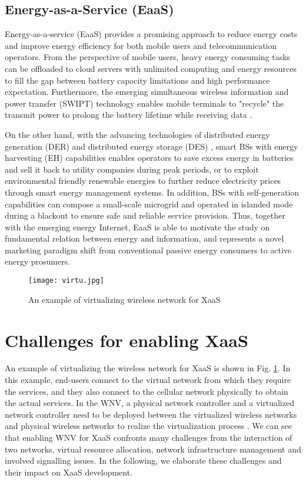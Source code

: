 \documentclass[12pt,draftclsnofoot,onecolumn]{IEEEtran}
\begin{document}
\subsection{Energy-as-a-Service (EaaS)}

Energy-as-a-service (EaaS) provides a promising approach to reduce
energy costs and improve energy efficiency for both mobile users
and telecommunication operators. From the perspective of mobile
users, heavy energy consuming tasks can be offloaded to cloud
servers with unlimited computing and energy resources to fill the
gap between battery capacity limitations and high performance
expectation. Furthermore, the emerging simultaneous wireless
information and power transfer (SWIPT) technology enables mobile
terminals to "recycle" the transmit power to prolong the battery
lifetime while receiving data \cite{Chang2}. \par

On the other hand, with the advancing technologies of distributed
energy generation (DER) and distributed energy storage (DES) \cite{Zhou},
smart BSs with energy harvesting (EH) capabilities enables
operators to save excess energy in batteries and sell it back to
utility companies during peak periods, or to exploit environmental
friendly renewable energies to further reduce electricity prices
through smart energy management systems. In addition, BSs with
self-generation capabilities can compose a small-scale microgrid
and operated in islanded mode during a blackout to ensure safe and
reliable service provision. Thus, together with the emerging
energy Internet, EaaS is able to motivate the study on fundamental
relation between energy and information, and represents a novel
marketing paradigm shift from conventional passive energy
consumers to active energy prosumers.

\begin{figure}[t]
\centering
\texttt{[image: virtu.jpg]}
\caption{An example of virtualizing wireless network for XaaS} \label{fig:example}
\end{figure}

\section{Challenges for enabling XaaS}
An example of virtualizing the wireless network for XaaS is shown
in Fig. \ref{fig:example}. In this example, end-users connect to
the virtual network from which they require the services, and they
also connect to the cellular network physically to obtain the
actual services. In the WNV, a physical network controller and a
virtualized network controller need to be deployed between the
virtualized wireless networks and physical wireless networks to realize the
virtualization process \cite{Liang}. We can see that enabling WNV
for XaaS confronts many challenges from the interaction of two
networks, virtual resource allocation, network infrastructure
management and involved signalling issues. In the following, we
elaborate these challenges and their impact on XaaS development.
\end{document}
